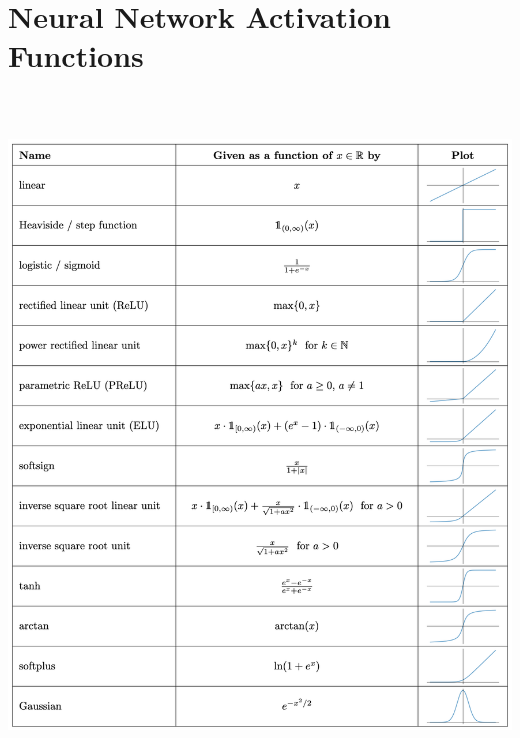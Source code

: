 \documentclass[11pt]{article}
\newcommand{\kolja}[1]{\textcolor{red}{#1}}
\theoremstyle{definition}
\begin{document}
\newpage
\renewcommand{\thepage}{}

\nocite{*}

  

\newpage



\appendix

\section{Neural Network Activation Functions} \label{apx:activation}
\bigskip
\begin{center}
    \centering
    \includegraphics[width=\textwidth, height=18cm, keepaspectratio=true]{images/activation_functions.png}
    \label{fig:activation_functions}
\end{center}
\end{document}
